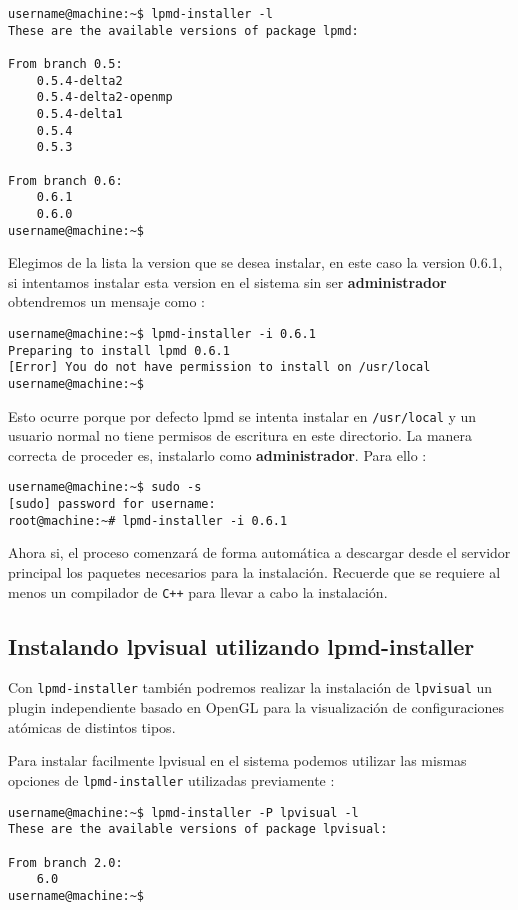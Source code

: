 \begin{verbatim}
username@machine:~$ lpmd-installer -l
These are the available versions of package lpmd:

From branch 0.5: 
    0.5.4-delta2
    0.5.4-delta2-openmp
    0.5.4-delta1
    0.5.4
    0.5.3

From branch 0.6: 
    0.6.1
    0.6.0
username@machine:~$
\end{verbatim}

Elegimos de la lista la version que se desea instalar, en este caso la version 0.6.1, si intentamos instalar esta version en el sistema sin ser \textbf{administrador} obtendremos un mensaje como  :

\begin{verbatim}
username@machine:~$ lpmd-installer -i 0.6.1
Preparing to install lpmd 0.6.1
[Error] You do not have permission to install on /usr/local
username@machine:~$
\end{verbatim}

Esto ocurre porque por defecto lpmd se intenta instalar en \verb|/usr/local| y un usuario normal no tiene permisos de escritura en este directorio. La manera correcta de proceder es, instalarlo como \textbf{administrador}. Para ello :

\begin{verbatim}
username@machine:~$ sudo -s
[sudo] password for username: 
root@machine:~# lpmd-installer -i 0.6.1
\end{verbatim}

Ahora si, el proceso comenzar\'a de forma autom\'atica a descargar desde el servidor principal los paquetes necesarios para la instalaci\'on. Recuerde que se requiere al menos un compilador de \verb|C++| para llevar a cabo la instalaci\'on.

\subsection{Instalando lpvisual utilizando lpmd-installer}

Con \verb|lpmd-installer| tambi\'en podremos realizar la instalaci\'on de \verb|lpvisual| un plugin independiente basado en OpenGL para la visualizaci\'on de configuraciones at\'omicas de distintos tipos.

Para instalar facilmente lpvisual en el sistema podemos utilizar las mismas opciones de \verb|lpmd-installer| utilizadas previamente :

\begin{verbatim}
username@machine:~$ lpmd-installer -P lpvisual -l
These are the available versions of package lpvisual:

From branch 2.0: 
    6.0
username@machine:~$  
\end{verbatim}

